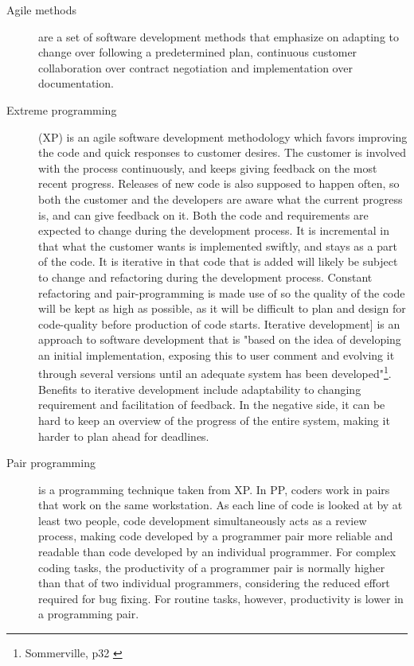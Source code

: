 \begin{description}

\item[Agile methods] \label{def:agile} are a set of software development methods that emphasize on adapting to change over following a predetermined plan, continuous customer collaboration over contract negotiation and implementation over documentation.

\item[Extreme programming] (XP) is an agile software development methodology which favors improving the code and quick responses to customer desires. The customer is involved with the process continuously, and keeps giving feedback on the most recent progress. Releases of new code is also supposed to happen often, so both the customer and the developers are aware what the current progress is, and can give feedback on it. Both the code and requirements are expected to change during the development process. It is incremental in that what the customer wants is implemented swiftly, and stays as a part of the code. It is iterative in that code that is added will likely be subject to change and refactoring during the development process. Constant refactoring and pair-programming is made use of so the quality of the code will be kept as high as possible, as it will be difficult to plan and design for code-quality before production of code starts. 
Iterative development] \label{def:incrementalDev} is an approach to software development that is "based on the idea of developing an initial implementation, exposing this to user comment and evolving it through several versions until an adequate system has been developed"\footnote{Sommerville, p32 \cite{sommerville}}. Benefits to iterative development include adaptability to changing requirement and facilitation of feedback. In the negative side, it can be hard to keep an overview of the progress of the entire system, making it harder to plan ahead for deadlines.

\item[Pair programming] \label{def:pairprogram} is a programming technique taken from XP. In PP, coders work in pairs that work on the same workstation. As each line of code is looked at by at least two people, code development simultaneously acts as a review process, making code developed by a programmer pair more reliable and readable than code developed by an individual programmer. For complex coding tasks, the productivity of a programmer pair is normally higher than that of two individual programmers, considering the reduced effort required for bug fixing. For routine tasks, however, productivity is lower in a programming pair.


\end{description}
